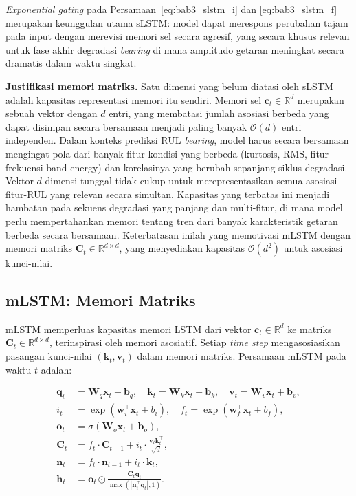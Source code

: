 \emph{Exponential gating} pada Persamaan~\ref{eq:bab3_slstm_i} dan
\ref{eq:bab3_slstm_f} merupakan keunggulan utama sLSTM: model dapat merespons
perubahan tajam pada input dengan merevisi memori sel secara agresif, yang
secara khusus relevan untuk fase akhir degradasi \emph{bearing} di mana amplitudo
getaran meningkat secara dramatis dalam waktu singkat.

\textbf{Justifikasi memori matriks.} Satu dimensi yang belum diatasi oleh
sLSTM adalah kapasitas representasi memori itu sendiri. Memori sel $\mathbf{c}_t
\in \mathbb{R}^d$ merupakan sebuah vektor dengan $d$ entri, yang membatasi
jumlah asosiasi berbeda yang dapat disimpan secara bersamaan menjadi paling
banyak $\mathcal{O}(d)$ entri independen. Dalam konteks prediksi RUL \emph{bearing},
model harus secara bersamaan mengingat pola dari banyak fitur kondisi yang
berbeda (kurtosis, RMS, fitur frekuensi band-energy) dan korelasinya yang
berubah sepanjang siklus degradasi. Vektor $d$-dimensi tunggal tidak cukup
untuk merepresentasikan semua asosiasi fitur-RUL yang relevan secara simultan.
Kapasitas yang terbatas ini menjadi hambatan pada sekuens degradasi yang panjang
dan multi-fitur, di mana model perlu mempertahankan memori tentang tren dari
banyak karakteristik getaran berbeda secara bersamaan. Keterbatasan inilah yang
memotivasi mLSTM dengan memori matriks $\mathbf{C}_t \in \mathbb{R}^{d \times d}$,
yang menyediakan kapasitas $\mathcal{O}(d^2)$ untuk asosiasi kunci-nilai.

\subsection{mLSTM: Memori Matriks}
\label{subsec:bab3_mlstm}

mLSTM  memperluas kapasitas memori LSTM dari vektor
$\mathbf{c}_t \in \mathbb{R}^d$ ke matriks $\mathbf{C}_t \in \mathbb{R}^{d \times d}$,
terinspirasi oleh memori asosiatif. Setiap \emph{time step} mengasosiasikan
pasangan kunci-nilai $(\mathbf{k}_t, \mathbf{v}_t)$ dalam memori matriks.
Persamaan mLSTM pada waktu $t$ adalah:

\begin{align}
  \mathbf{q}_t &= \mathbf{W}_q \mathbf{x}_t + \mathbf{b}_q, \quad
  \mathbf{k}_t = \mathbf{W}_k \mathbf{x}_t + \mathbf{b}_k, \quad
  \mathbf{v}_t = \mathbf{W}_v \mathbf{x}_t + \mathbf{b}_v,
    \label{eq:bab3_mlstm_qkv} \\
  i_t &= \exp(\mathbf{w}_i^\top \mathbf{x}_t + b_i), \quad
  f_t = \exp(\mathbf{w}_f^\top \mathbf{x}_t + b_f),
    \label{eq:bab3_mlstm_gates} \\
  \mathbf{o}_t &= \sigma(\mathbf{W}_o \mathbf{x}_t + \mathbf{b}_o),
    \label{eq:bab3_mlstm_o} \\
  \mathbf{C}_t &= f_t \cdot \mathbf{C}_{t-1}
    + i_t \cdot \frac{\mathbf{v}_t \mathbf{k}_t^\top}{\sqrt{d}},
    \label{eq:bab3_mlstm_C} \\
  \mathbf{n}_t &= f_t \cdot \mathbf{n}_{t-1} + i_t \cdot \mathbf{k}_t,
    \label{eq:bab3_mlstm_n} \\
  \mathbf{h}_t &= \mathbf{o}_t \odot \frac{\mathbf{C}_t \mathbf{q}_t}{\max(|\mathbf{n}_t^\top \mathbf{q}_t|, 1)}.
    \label{eq:bab3_mlstm_h}
\end{align}


